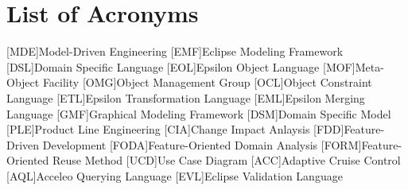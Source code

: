 \documentclass[12pt, oneside]{book}
\begin{document}

\frontmatter   
\doublespacing
	
	
	
	\setcounter{page}{2}
	\pagestyle{plain}
	
	

	
	
	

	


	
\onehalfspacing
	\tableofcontents
	\label{ContentStart}	%

	\listoffigures
	
	\listoftables
	
	\clearpage
	
	\section*{List of Acronyms}
		\begin{acronym}
			[MDE]{Model-Driven Engineering}
			[EMF]{Eclipse Modeling Framework}
			[DSL]{Domain Specific Language}
			[EOL]{Epsilon Object Language}
			[MOF]{Meta-Object Facility}
			[OMG]{Object Management Group}
			[OCL]{Object Constraint Language}
			[ETL]{Epsilon Transformation Language}
			[EML]{Epsilon Merging Language}
			[GMF]{Graphical Modeling Framework}
			[DSM]{Domain Specific Model}
			[PLE]{Product Line Engineering}
			[CIA]{Change Impact Anlaysis}
			[FDD]{Feature-Driven Development}
			[FODA]{Feature-Oriented Domain Analysis}
			[FORM]{Feature-Oriented Reuse Method}
			[UCD]{Use Case Diagram}
			[ACC]{Adaptive Cruise Control}
			[AQL]{Acceleo Querying Language}
			[EVL]{Eclipse Validation Language}
		\end{acronym}
\end{document}
